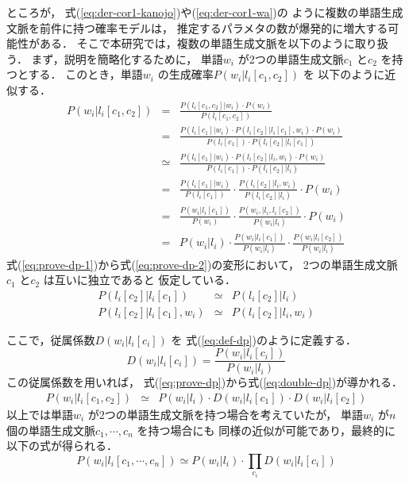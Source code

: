 ところが，
式(\ref{eq:der-cor1-kanojo})や(\ref{eq:der-cor1-wa})の
ように複数の単語生成文脈を前件に持つ確率モデルは，
推定するパラメタの数が爆発的に増大する可能性がある．
そこで本研究では，複数の単語生成文脈を以下のように取り扱う．
まず，説明を簡略化するために，
単語$w_i$ が2つの単語生成文脈$c_1$ と$c_2$ を持つとする．
このとき，単語$w_i$ の生成確率$P(w_i | l_i[c_1,c_2])$ を
以下のように近似する．
\begin{eqnarray}
  P(w_i|l_i[c_1,c_2])&=&
  \frac{P(l_i[c_1,c_2]|w_i) \cdot P(w_i)}{P(l_i[c_1,c_2])} \\
  \label{eq:prove-dp-1}
  &=&
  \frac{P(l_i[c_1]|w_i) \cdot P(l_i[c_2]|l_i[c_1],w_i) \cdot P(w_i)}
       {P(l_i[c_1]) \cdot P(l_i[c_2]|l_i[c_1])} \\
  \label{eq:prove-dp-2}
  &\simeq&
  \frac{P(l_i[c_1]|w_i) \cdot P(l_i[c_2]|l_i,w_i) \cdot P(w_i)}
       {P(l_i[c_1]) \cdot P(l_i[c_2]|l_i)} \\
  &=&
  \frac{P(l_i[c_1]|w_i)}{P(l_i[c_1])} \cdot
  \frac{P(l_i[c_2]|l_i,w_i)}{P(l_i[c_2]|l_i)} \cdot P(w_i) \\
  &=&
  \frac{P(w_i|l_i[c_1])}{P(w_i)} \cdot
  \frac{P(w_i,|l_i,l_i[c_2])}{P(w_i|l_i)} \cdot P(w_i) \\
  \label{eq:prove-dp}
  &=&
  P(w_i|l_i)\cdot
  \frac{P(w_i|l_i[c_1])}{P(w_i|l_i)}\cdot
  \frac{P(w_i|l_i[c_2])}{P(w_i|l_i)}
\end{eqnarray}
式(\ref{eq:prove-dp-1})から式(\ref{eq:prove-dp-2})の変形において，
2つの単語生成文脈$c_1$ と$c_2$ は互いに独立であると
仮定している．
\begin{eqnarray}
   P(l_i[c_2]|l_i[c_1]) &\simeq& P(l_i[c_2]|l_i)\\
   P(l_i[c_2]|l_i[c_1],w_i) &\simeq& P(l_i[c_2]|l_i,w_i)
\end{eqnarray} 

ここで，従属係数$D(w_i|l_i[c_i])$ を
式(\ref{eq:def-dp})のように定義する．
\begin{equation}
  \label{eq:def-dp}
  D(w_i|l_i[c_i]) = \frac{P(w_i|l_i[c_i])}{P(w_i|l_i)}
\end{equation}
この従属係数を用いれば，
式(\ref{eq:prove-dp})から式(\ref{eq:double-dp})が導かれる．
\begin{eqnarray}
  \label{eq:double-dp}
  P(w_i|l_i[c_1,c_2]) &\simeq&
  P(w_i|l_i)\cdot D(w_i|l_i[c_1])\cdot D(w_i|l_i[c_2])
\end{eqnarray}
以上では単語$w_i$ が2つの単語生成文脈を持つ場合を考えていたが，
単語$w_i$ が$n$ 個の単語生成文脈$c_1,\cdots,c_n$ を持つ場合にも
同様の近似が可能であり，最終的に以下の式が得られる．
\begin{equation}
  \label{eq:multi-dp}
  P(w_i | l_i[c_1,\cdots,c_n]) \simeq
  P(w_i | l_i) \cdot \prod_{c_i} D(w_i | l_i[c_i])
\end{equation}


